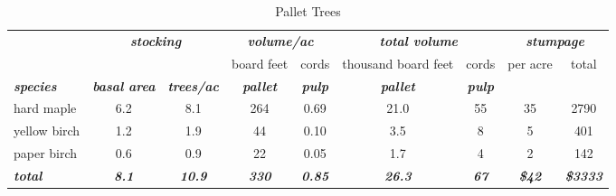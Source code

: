 \documentclass[landscape]{article}
\begin{document}
\begin{table}[H]

\caption{\label{tab:unnamed-chunk-55}Pallet Trees}
\fontsize{10}{12}\selectfont
\begin{tabular}[t]{lcccccccc}
\toprule
\multicolumn{1}{c}{\em{\textbf{ }}} & \multicolumn{2}{c}{\em{\textbf{stocking}}} & \multicolumn{2}{c}{\em{\textbf{volume/ac }}} & \multicolumn{2}{c}{\em{\textbf{total volume}}} & \multicolumn{2}{c}{\em{\textbf{stumpage}}} \\
\cmidrule(l{3pt}r{3pt}){2-3} \cmidrule(l{3pt}r{3pt}){4-5} \cmidrule(l{3pt}r{3pt}){6-7} \cmidrule(l{3pt}r{3pt}){8-9}
\multicolumn{3}{c}{ } & \multicolumn{1}{c}{board feet} & \multicolumn{1}{c}{cords} & \multicolumn{1}{c}{thousand board feet} & \multicolumn{1}{c}{cords} & \multicolumn{1}{c}{per acre} & \multicolumn{1}{c}{total} \\
\cmidrule(l{3pt}r{3pt}){4-4} \cmidrule(l{3pt}r{3pt}){5-5} \cmidrule(l{3pt}r{3pt}){6-6} \cmidrule(l{3pt}r{3pt}){7-7} \cmidrule(l{3pt}r{3pt}){8-8} \cmidrule(l{3pt}r{3pt}){9-9}
\rowcolor[HTML]{DCDCDC}  \em{\textbf{species}} & \em{\textbf{basal area}} & \em{\textbf{trees/ac}} & \em{\textbf{pallet}} & \em{\textbf{pulp}} & \em{\textbf{pallet}} & \em{\textbf{pulp}} & \em{\textbf{ }} & \em{\textbf{ }}\\
\midrule
\rowcolor{gray!6}  hard maple & 6.2 & 8.1 & 264 & 0.69 & 21.0 & 55 & 35 & 2790\\
 
yellow birch & 1.2 & 1.9 & 44 & 0.10 & 3.5 & 8 & 5 & 401\\
 
\rowcolor{gray!6}  paper birch & 0.6 & 0.9 & 22 & 0.05 & 1.7 & 4 & 2 & 142\\
 
\rowcolor[HTML]{DCDCDC}  \em{\textbf{total}} & \em{\textbf{8.1}} & \em{\textbf{10.9}} & \em{\textbf{330}} & \em{\textbf{0.85}} & \em{\textbf{26.3}} & \em{\textbf{67}} & \em{\textbf{\$42}} & \em{\textbf{\$3333}}\\
\bottomrule
\end{tabular}
\end{table}
\end{document}
